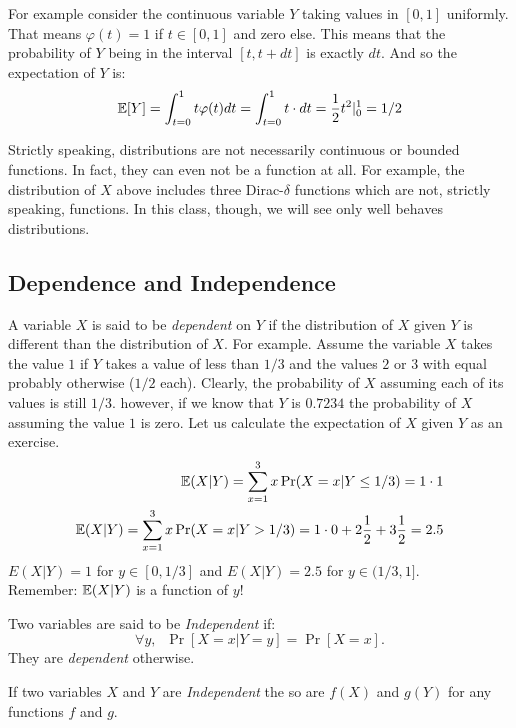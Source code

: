 \documentclass{article}
\begin{document}
For example consider the continuous variable $Y$ taking values in
$[0,1]$ uniformly. That means $\varphi(t) = 1$ if $t \in [0,1]$ and zero else.
This means that the probability of $Y$ being in the interval $[t,t + dt]$ is exactly $dt$. And so the expectation of $Y$ is:
\begin{equation}
{\mathbb E}[Y] = \int_{t=0}^{1}t \varphi(t) dt = \int_{t=0}^{1}t \cdot dt = \frac{1}{2}t^2|_{0}^{1} = 1/2
\end{equation}

\begin{remark}
Strictly speaking, distributions are not necessarily continuous or bounded functions. 
In fact, they can even not be a function at all. 
For example, the distribution of $X$ above includes three Dirac-$\delta$ functions which are not, strictly speaking, functions.
In this class, though, we will see only well behaves distributions.
\end{remark}


\subsection{Dependence and Independence}
A variable $X$ is said to be {\it dependent} on $Y$ if the distribution of $X$ given $Y$ is different than the distribution of $X$. 
For example. Assume the variable $X$ takes the value $1$ if $Y$ takes a
value of less than $1/3$ and the values $2$ or $3$ with equal probably otherwise ($1/2$ each).
%
Clearly, the probability of $X$ assuming each of its values is still
$1/3$. however, if we know that $Y$ is $0.7234$ the probability of
$X$ assuming the value $1$ is zero. Let us calculate the expectation of $X$ given $Y$ as an exercise.
\begin{eqnarray}
{\mathbb E}(X | Y) = \sum_{x=1}^{3} x \Pr(X = x | Y \le 1/3) = 1\cdot 1\\
{\mathbb E}(X | Y) = \sum_{x=1}^{3} x \Pr(X = x | Y > 1/3) = 1\cdot 0 + 2
\frac{1}{2} + 3\frac{1}{2}  = 2.5
\end{eqnarray}
$E(X | Y) = 1$ for $y \in [0,1/3]$ and $E(X | Y) = 2.5$ for $y \in (1/3,1]$.\\
Remember: ${\mathbb E}(X | Y)$ is a function of $y$!

\begin{definition}[Independence]
Two variables are said to be {\it Independent} if:
\[
\forall y,\;\;\Pr[ X=x | Y = y] = \Pr[X=x].
\]
They are {\it dependent} otherwise.
\end{definition}


\begin{fact}
If two variables $X$ and $Y$ are {\it Independent} the so are $f(X)$ and $g(Y)$ for any functions $f$ and $g$.
\end{fact}
\end{document}
